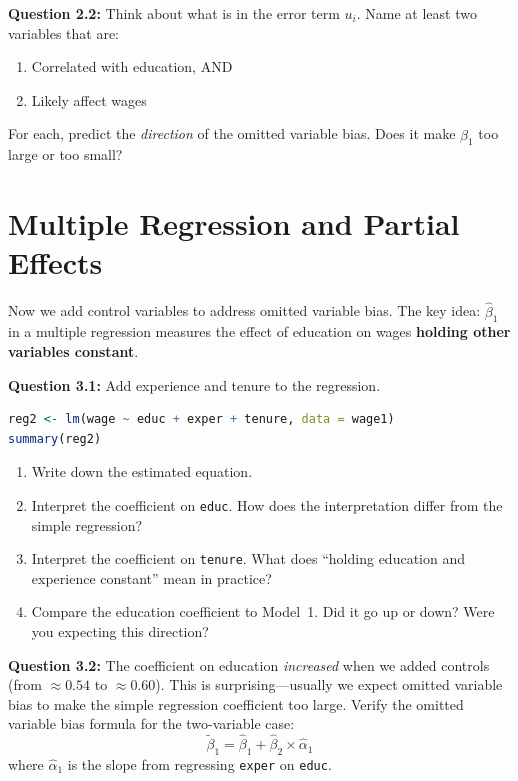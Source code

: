 \documentclass[11pt,letterpaper]{article}
\begin{document}
\vspace{4cm}

\textbf{Question 2.2:} Think about what is in the error term $u_i$. Name at least two variables that are:
\begin{enumerate}
\item Correlated with education, AND
\item Likely affect wages
\end{enumerate}
For each, predict the \textit{direction} of the omitted variable bias. Does it make $\hat{\beta}_1$ too large or too small?

\vspace{4cm}

\section{Multiple Regression and Partial Effects}

Now we add control variables to address omitted variable bias. The key idea: $\hat{\beta}_1$ in a multiple regression measures the effect of education on wages \textbf{holding other variables constant}.

\textbf{Question 3.1:} Add experience and tenure to the regression.

\begin{lstlisting}[language=R]
reg2 <- lm(wage ~ educ + exper + tenure, data = wage1)
summary(reg2)
\end{lstlisting}

\begin{enumerate}[label=(\alph*)]
\item Write down the estimated equation.
\item Interpret the coefficient on \texttt{educ}. How does the interpretation differ from the simple regression?
\item Interpret the coefficient on \texttt{tenure}. What does ``holding education and experience constant'' mean in practice?
\item Compare the education coefficient to Model~1. Did it go up or down? Were you expecting this direction?
\end{enumerate}

\vspace{4cm}

\newpage

\textbf{Question 3.2:} The coefficient on education \textit{increased} when we added controls (from $\approx 0.54$ to $\approx 0.60$). This is surprising---usually we expect omitted variable bias to make the simple regression coefficient too large. Verify the omitted variable bias formula for the two-variable case:
\[
\tilde{\beta}_1 = \hat{\beta}_1 + \hat{\beta}_2 \times \hat{\alpha}_1
\]
where $\hat{\alpha}_1$ is the slope from regressing \texttt{exper} on \texttt{educ}.
\end{document}
